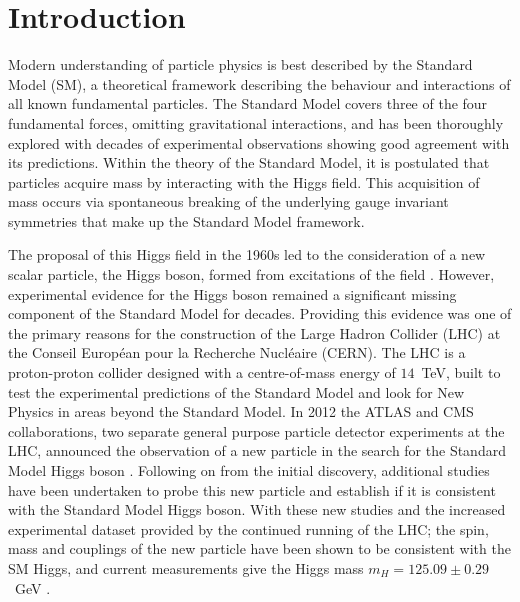 \chapter{Introduction}
\label{c:intro}

Modern understanding of particle physics is best described by the Standard Model (SM), a theoretical framework describing the behaviour and interactions of all known fundamental particles. The Standard Model covers three of the four fundamental forces, omitting gravitational interactions, and has been thoroughly explored with decades of experimental observations showing good agreement with its predictions. Within the theory of the Standard Model, it is postulated that particles acquire mass by interacting with the Higgs field. This acquisition of mass occurs via spontaneous breaking of the underlying gauge invariant symmetries that make up the Standard Model framework.

The proposal of this Higgs field in the 1960s led to the consideration of a new scalar particle, the Higgs boson, formed from excitations of the field \cite{gauge-boson-mass, higgs-1, higgs-2}. However, experimental evidence for the Higgs boson remained a significant missing component of the Standard Model for decades. Providing this evidence was one of the primary reasons for the construction of the Large Hadron Collider \cite{lhc} (LHC) at the  Conseil Europ\'{e}an pour la Recherche Nucl\'{e}aire (CERN). The LHC is a proton-proton collider designed with a centre-of-mass energy of $14$~TeV, built to test the experimental predictions of the Standard Model and look for New Physics in areas beyond the Standard Model. In 2012 the ATLAS and CMS collaborations, two separate general purpose particle detector experiments at the LHC, announced the observation of a new particle in the search for the Standard Model Higgs boson \cite{cmshiggs, atlashiggs}. Following on from the initial discovery, additional studies have been undertaken to probe this new particle and establish if it is consistent with the Standard Model Higgs boson. With these new studies and the increased experimental dataset provided by the continued running of the LHC; the spin, mass and couplings of the new particle have been shown to be consistent with the SM Higgs, and current measurements give the Higgs mass $m_H=125.09\pm0.29$~GeV \cite{higgsmeasure}.

